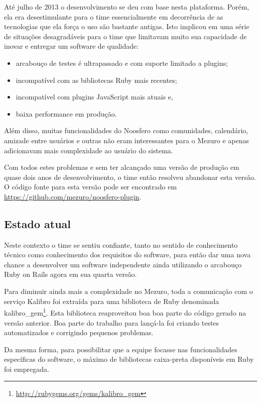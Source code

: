 \documentclass[12pt]{article}
\begin{document}
  Até julho de 2013 o desenvolvimento se deu com base nesta plataforma. Porém, ela era desestimulante para o time essencialmente em decorrência de as tecnologias que ela força o uso são bastante antigas. Isto implicou em uma série de situações desagradáveis para o time que limitavam muito sua capacidade de inovar e entregar um software de qualidade:

  \begin{itemize}
    \item arcabouço de testes é ultrapassado e com suporte limitado a plugins;
    \item incompatível com as bibliotecas Ruby mais recentes;
    \item incompatível com plugins JavaScript mais atuais e,
    \item baixa performance em produção.
  \end{itemize}

  Além disso, muitas funcionalidades do Noosfero como comunidades, calendário, amizade entre usuários e outras não eram interessantes para o Mezuro e apenas adicionavam mais complexidade ao usuário do sistema.

  Com todos estes problemas e sem ter alcançado uma versão de produção em quase dois anos de desenvolvimento, o time então resolveu abandonar esta versão. O código fonte para esta versão pode ser encontrado em \url{https://github.com/mezuro/noosfero-plugin}.

  \subsection{Estado atual} \label{subsec:estado-atual}
  Neste contexto o time se sentiu confiante, tanto no sentido de conhecimento técnico como conhecimento dos requisitos do software, para então dar uma nova chance a desenvolver um software independente ainda utilizando o arcabouço Ruby on Rails agora em sua quarta versão.

  Para diminuir ainda mais a complexidade no Mezuro, toda a comunicação com o serviço Kalibro foi extraída para uma biblioteca de Ruby denominada kalibro\_gem\footnote{\url{http://rubygems.org/gems/kalibro_gem}}. Esta biblioteca reaproveitou boa boa parte do código gerado na versão anterior. Boa parte do trabalho para lançá-la foi criando testes automatizados e corrigindo pequenos problemas.

  Da mesma forma, para possibilitar que a equipe focasse nas funcionalidades específicas do software, o máximo de bibliotecas caixa-preta disponíveis em Ruby foi empregada.
\end{document}
